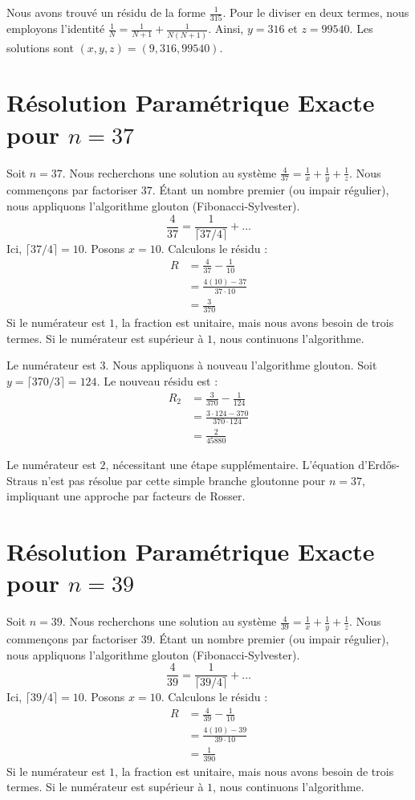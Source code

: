 \documentclass[11pt,a4paper]{article}
\begin{document}
Nous avons trouvé un résidu de la forme $\frac{1}{315}$. Pour le diviser en deux termes, nous employons l'identité $\frac{1}{N} = \frac{1}{N+1} + \frac{1}{N(N+1)}$.
Ainsi, $y = 316$ et $z = 99540$.
Les solutions sont $(x, y, z) = (9, 316, 99540)$.

\section{Résolution Paramétrique Exacte pour $n = 37$}
Soit $n = 37$. Nous recherchons une solution au système $\frac{4}{37} = \frac{1}{x} + \frac{1}{y} + \frac{1}{z}$.
Nous commençons par factoriser $37$. Étant un nombre premier (ou impair régulier), nous appliquons l'algorithme glouton (Fibonacci-Sylvester).
\begin{equation}
\frac{4}{37} = \frac{1}{\lceil 37/4 \rceil} + \ldots
\end{equation}
Ici, $\lceil 37/4 \rceil = 10$. Posons $x = 10$.
Calculons le résidu :
\begin{align*}
R &= \frac{4}{37} - \frac{1}{10} \\
&= \frac{4(10) - 37}{37 \cdot 10} \\
&= \frac{3}{370}
\end{align*}
Si le numérateur est $1$, la fraction est unitaire, mais nous avons besoin de trois termes. Si le numérateur est supérieur à $1$, nous continuons l'algorithme.

Le numérateur est $3$. Nous appliquons à nouveau l'algorithme glouton.
Soit $y = \lceil 370/3 \rceil = 124$.
Le nouveau résidu est :
\begin{align*}
R_2 &= \frac{3}{370} - \frac{1}{124} \\
&= \frac{3 \cdot 124 - 370}{370 \cdot 124} \\
&= \frac{2}{45880}
\end{align*}

Le numérateur est $2$, nécessitant une étape supplémentaire. L'équation d'Erd\H{o}s-Straus n'est pas résolue par cette simple branche gloutonne pour $n=37$, impliquant une approche par facteurs de Rosser.

\section{Résolution Paramétrique Exacte pour $n = 39$}
Soit $n = 39$. Nous recherchons une solution au système $\frac{4}{39} = \frac{1}{x} + \frac{1}{y} + \frac{1}{z}$.
Nous commençons par factoriser $39$. Étant un nombre premier (ou impair régulier), nous appliquons l'algorithme glouton (Fibonacci-Sylvester).
\begin{equation}
\frac{4}{39} = \frac{1}{\lceil 39/4 \rceil} + \ldots
\end{equation}
Ici, $\lceil 39/4 \rceil = 10$. Posons $x = 10$.
Calculons le résidu :
\begin{align*}
R &= \frac{4}{39} - \frac{1}{10} \\
&= \frac{4(10) - 39}{39 \cdot 10} \\
&= \frac{1}{390}
\end{align*}
Si le numérateur est $1$, la fraction est unitaire, mais nous avons besoin de trois termes. Si le numérateur est supérieur à $1$, nous continuons l'algorithme.
\end{document}
